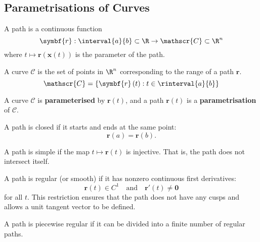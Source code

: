 \documentclass{article}
\begin{document}
\subsection{Parametrisations of Curves}
\begin{definition}[Path]
    A path is a continuous function
    \begin{equation*}
        \symbf{r} : \interval{a}{b} \subset \R \to \mathscr{C} \subset \R^n
    \end{equation*}
    where \(t \mapsto \symbf{r}\left( \symbf{x}\left( t \right) \right)\)
    is the parameter of the path.
\end{definition}
\begin{definition}[Curve]
    A curve \(\mathscr{C}\) is the set of points in \(\R^n\)
    corresponding to the range of a path \(\symbf{r}\).
    \begin{equation*}
        \mathscr{C} = \left\{ \symbf{r}\left( t \right) : t \in \rinterval{a}{b} \right\}
    \end{equation*}
\end{definition}
A curve \(\mathscr{C}\) is \textbf{parameterised} by \(\symbf{r}\left( t \right)\),
and a path \(\symbf{r}\left( t \right)\) is a \textbf{parametrisation}
of \(\mathscr{C}\).
\begin{definition}
    A path is closed if it starts and ends at the same point:
    \begin{equation*}
        \symbf{r}\left( a \right) = \symbf{r}\left( b \right).
    \end{equation*}
\end{definition}
\begin{definition}
    A path is simple if the map \(t \mapsto \symbf{r}\left( t \right)\)
    is injective. That is, the path does not intersect itself.
\end{definition}
\begin{definition}
    A path is regular (or smooth) if it has nonzero continuous first derivatives:
    \begin{equation*}
        \symbf{r}\left( t \right) \in C^1 \quad \text{and} \quad
        \symbf{r}'\left( t \right) \neq \symbf{0}
    \end{equation*}
    for all \(t\). This restriction ensures that the path does not have
    any cusps and allows a unit tangent vector to be defined.
\end{definition}
\begin{definition}
    A path is piecewise regular if it can be divided into a finite
    number of regular paths.
\end{definition}
\end{document}
